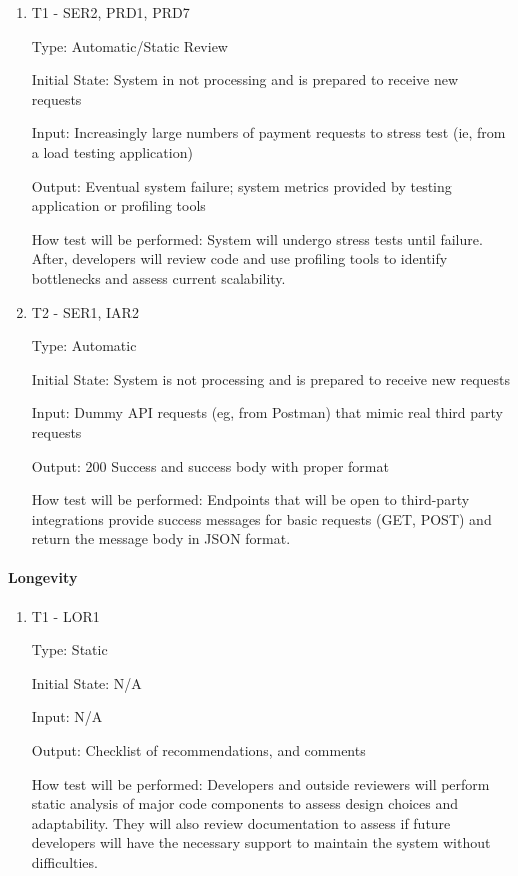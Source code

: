 \documentclass[12pt, titlepage]{article}
\begin{document}
\begin{enumerate}
\item{T1 - SER2, PRD1, PRD7\\}

Type: Automatic/Static Review

Initial State: System in not processing and is prepared to receive new requests

Input: Increasingly large numbers of payment requests to stress test (ie, from a load testing application)

Output: Eventual system failure; system metrics provided by testing application or profiling tools

How test will be performed: System will undergo stress tests until failure. After, developers will review code and use profiling tools to identify bottlenecks and assess current scalability.

\item{T2 - SER1, IAR2\\}

Type: Automatic

Initial State: System is not processing and is prepared to receive new requests

Input: Dummy API requests (eg, from Postman) that mimic real third party requests

Output: 200 Success and success body with proper format

How test will be performed: Endpoints that will be open to third-party integrations provide success messages for basic requests (GET, POST) and return the message body in JSON format.

\end{enumerate}

\paragraph{Longevity}

\begin{enumerate}

\item{T1 - LOR1\\}

Type: Static

Initial State: N/A

Input: N/A

Output: Checklist of recommendations, and comments

How test will be performed: Developers and outside reviewers will perform static analysis of major code components to assess design choices and adaptability. They will also review documentation to assess if future developers will have the necessary support to maintain the system without difficulties.

\end{enumerate}
\end{document}
